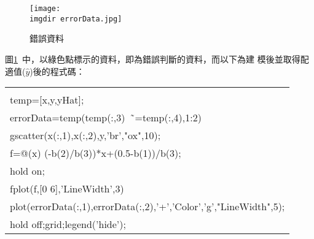 			\begin{figure}[H]	
		 		 \centering	 			 	 
   				 \texttt{[image: \\imgdir errorData.jpg]} 
   			 	\caption{錯誤資料}   		
   			 	\label{fig:errorData}   			 		 
			\end{figure}
			圖\ref{fig:errorData}\ 中，以綠色點標示的資料，即為錯誤判斷的資料，而以下為建					模後並取得配適值($\hat{y}$)後的程式碼：
			\begin{center}\colorbox{slight}{
				\begin{tabular}{p{}}
					\MJHmarker{\textbf{\color{darkblue}{MATLAB語法 :}}}\\		
					temp=[x,y,yHat];\\
					errorData=temp(temp(:,3)\ \~\  =temp(:,4),1:2)\\
					gscatter(x(:,1),x(:,2),y,'br',"ox",10);\\
					f=@(x) (-b(2)/b(3))*x+(0.5-b(1))/b(3);\\
					hold on;\\
					fplot(f,[0 6],'LineWidth',3)\\
					plot(errorData(:,1),errorData(:,2),'+','Color','g',"LineWidth",5);
					\\
					hold off;grid;legend('hide');\\				
				\end{tabular}
			}
			\end{center}
